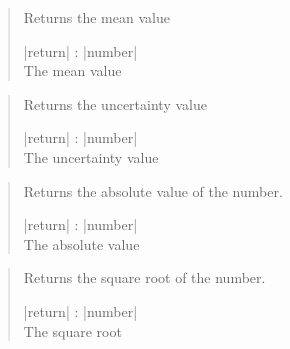 \documentclass{ltxdoc}
\begin{document}
\begin{quote}
  Returns the mean value

  \subtitle{Parameters / Return}
  \begin{description}
  \item |return| : |number|\\
    The mean value
  \end{description}
\end{quote}

\begin{quote}
  Returns the uncertainty value

  \subtitle{Parameters / Return}
  \begin{description}
  \item |return| : |number|\\
    The uncertainty value
  \end{description}
\end{quote}


\begin{quote}
  Returns the absolute value of the number.

  \subtitle{Parameters / Return}
  \begin{description}
  \item |return| : |number|\\
    The absolute value
  \end{description}
\end{quote}

\begin{quote}
  Returns the square root of the number.

  \subtitle{Parameters / Return}
  \begin{description}
  \item |return| : |number|\\
    The square root
  \end{description}
\end{quote}





\newpage
{}




\newpage
{}
\indexprologue{}
\printindex[unit]

\newpage
{}
\indexprologue{}
\printindex[cur]
\end{document}
